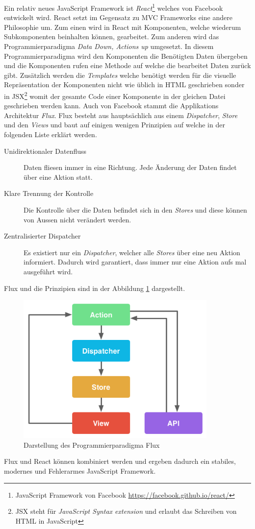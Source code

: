\newline{}
Ein relativ neues JavaScript Framework ist \textit{React}\footnote{JavaScript Framework von Facebook \url{https://facebook.github.io/react/}} welches von Facebook entwickelt wird. React setzt im Gegensatz zu MVC Frameworks eine andere Philosophie um. Zum einen wird in React mit Komponenten, welche wiederum Subkomponenten beinhalten können, gearbeitet. Zum anderen wird das Programmierparadigma \textit{Data Down, Actions up} umgesetzt. In diesem Programmierparadigma wird den Komponenten die Benötigten Daten übergeben und die Komponenten rufen eine Methode auf welche die bearbeitet Daten zurück gibt. Zusätzlich werden die \textit{Templates} welche benötigt werden für die visuelle Repräsentation der Komponenten nicht wie üblich in HTML geschrieben sonder in JSX\footnote{JSX steht für \textit{JavaScript Syntax extension} und erlaubt das Schreiben von HTML in JavaScript} womit der gesamte Code einer Komponente in der gleichen Datei geschrieben werden kann. Auch von Facebook stammt die Applikations Architektur \textit{Flux}. Flux besteht aus hauptsächlich aus einem \textit{Dispatcher}, \textit{Store} und den \textit{Views} und baut auf einigen wenigen Prinzipien auf welche in der folgenden Liste erklärt werden.
\begin{description}
	\item[Unidirektionaler Datenfluss] Daten fliesen immer in eine Richtung. Jede Änderung der Daten findet über eine Aktion statt.
	\item[Klare Trennung der Kontrolle] Die Kontrolle über die Daten befindet sich in den \textit{Stores} und diese können von Aussen nicht verändert werden.
	\item[Zentralisierter Dispatcher] Es existiert nur ein \textit{Dispatcher}, welcher alle \textit{Stores} über eine neu Aktion informiert. Dadurch wird garantiert, dass immer nur eine Aktion aufs mal ausgeführt wird.
\end{description}
Flux und die Prinzipien sind in der Abbildung \ref{fig:flux} dargestellt.

\begin{figure}[ht]
	\centering
  \includegraphics[width=0.88\textwidth]{images/flux.png}
	\caption{Darstellung des Programmierparadigma Flux}
	\label{fig:flux}
\end{figure}
Flux und React können kombiniert werden und ergeben dadurch ein stabiles, modernes und Fehlerarmes JavaScript Framework.

